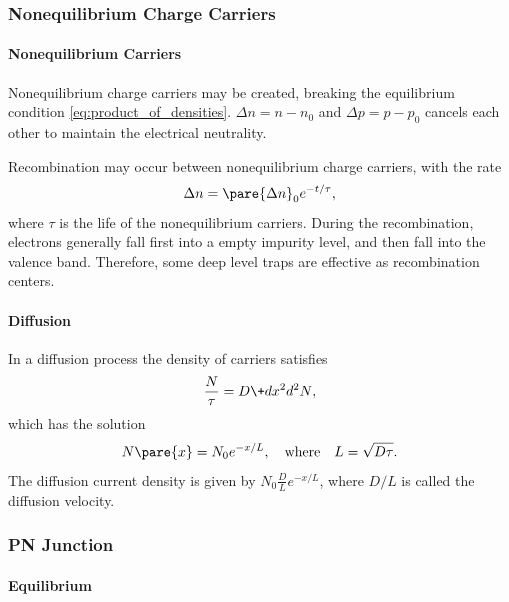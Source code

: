 \documentclass[hidelinks]{article}
\begin{document}

\subsubsection{Nonequilibrium Charge Carriers} %
\label{ssub:nonequilibrium_charge_carriers}

\paragraph{Nonequilibrium Carriers} %
\label{par:nonequilibrium_carriers}

Nonequilibrium charge carriers may be created, breaking the equilibrium condition \eqref{eq:product_of_densities}. $\Delta n = n-n_0$ and $\Delta p = p-p_0$ cancels each other to maintain the electrical neutrality.
\par
Recombination may occur between nonequilibrium charge carriers, with the rate
\[ \Delta n = \pare{\Delta n}_0 e^{-t/\tau}, \]
where $\tau$ is the life of the nonequilibrium carriers. During the recombination, electrons generally fall first into a empty impurity level, and then fall into the valence band. Therefore, some deep level traps are effective as recombination centers.


\paragraph{Diffusion} %
\label{par:diffusion}

In a diffusion process the density of carriers satisfies
\[ \frac{N}{\tau} = D\+d{x^2}{d^2 N}, \]
which has the solution
\[ N\pare{x} = N_0 e^{-x/L},\quad \text{where}\quad L = \sqrt{D\tau}. \]
The diffusion current density is given by $\displaystyle N_0 \frac{D}{L}e^{-x/L}$, where $D/L$ is called the diffusion velocity.



\subsubsection{PN Junction} %
\label{ssub:pn_junction}

\paragraph{Equilibrium} %
\label{par:equilibrium}
\end{document}
